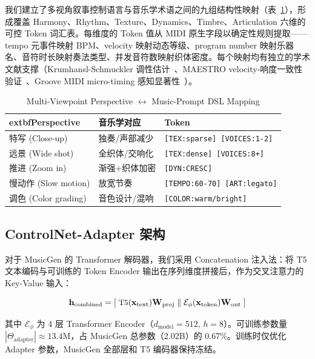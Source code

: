 \documentclass[11pt,twocolumn]{article}
\begin{document}
我们建立了多视角叙事控制语言与音乐学术语之间的九组结构性映射（表~\ref{tab:mapping}），形成覆盖 Harmony、Rhythm、Texture、Dynamics、Timbre、Articulation 六维的可控 Token 词汇表。每维度的 Token 值从 MIDI 原生字段以确定性规则提取——tempo 元事件映射 BPM、velocity 映射动态等级、program number 映射乐器名、音符时长映射奏法类型、并发音符数映射织体密度。每个映射均有独立的学术文献支撑（Krumhansl-Schmuckler 调性估计~\cite{krumhansl}、MAESTRO velocity-响度一致性验证~\cite{maestro}、Groove MIDI micro-timing 感知显著性~\cite{groove}）。

\begin{table}[t]
\centering\footnotesize
\caption{Multi-Viewpoint Perspective $\leftrightarrow$ Music-Prompt DSL Mapping}
\label{tab:mapping}
\begin{tabularx}{\columnwidth}{@{}l >{\raggedright\arraybackslash}X >{\raggedright\arraybackslash}X@{}}
\toprule
	extbf{Perspective} & \textbf{音乐学对应} & \textbf{Token} \\
\midrule
特写 (Close-up) & 独奏/声部减少 & \texttt{[TEX:sparse] [VOICES:1-2]} \\
远景 (Wide shot) & 全织体/交响化 & \texttt{[TEX:dense] [VOICES:8+]} \\
推进 (Zoom in) & 渐强+织体加密 & \texttt{[DYN:CRESC]} \\
慢动作 (Slow motion) & 放宽节奏 & \texttt{[TEMPO:60-70] [ART:legato]} \\
调色 (Color grading) & 音色设计/混响 & \texttt{[COLOR:warm/bright]} \\
\bottomrule
\end{tabularx}
\end{table}

\subsection{ControlNet-Adapter 架构}

对于 MusicGen 的 Transformer 解码器，我们采用 Concatenation 注入法：将 T5 文本编码与可训练的 Token Encoder 输出在序列维度拼接后，作为交叉注意力的 Key-Value 输入：

\begin{equation}\small
\mathbf{h}_{\text{combined}} = [\;\text{T5}(\mathbf{x}_{\text{text}})\mathbf{W}_{\text{proj}}\;\|\;
\mathcal{E}_{\phi}(\mathbf{x}_{\text{token}})\mathbf{W}_{\text{out}}\;]
\end{equation}

其中 $\mathcal{E}_{\phi}$ 为 4 层 Transformer Encoder（$d_{\text{model}}=512$, $h=8$）。可训练参数量 $|\Theta_{\text{adapter}}| \approx 13.4$M，占 MusicGen 总参数（2.02B）的 0.67\%。训练时仅优化 Adapter 参数，MusicGen 全部层和 T5 编码器保持冻结。
\end{document}
